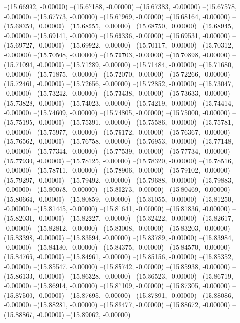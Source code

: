 --(15.66992, -0.00000)
--(15.67188, -0.00000)
--(15.67383, -0.00000)
--(15.67578, -0.00000)
--(15.67773, -0.00000)
--(15.67969, -0.00000)
--(15.68164, -0.00000)
--(15.68359, -0.00000)
--(15.68555, -0.00000)
--(15.68750, -0.00000)
--(15.68945, -0.00000)
--(15.69141, -0.00000)
--(15.69336, -0.00000)
--(15.69531, -0.00000)
--(15.69727, -0.00000)
--(15.69922, -0.00000)
--(15.70117, -0.00000)
--(15.70312, -0.00000)
--(15.70508, -0.00000)
--(15.70703, -0.00000)
--(15.70898, -0.00000)
--(15.71094, -0.00000)
--(15.71289, -0.00000)
--(15.71484, -0.00000)
--(15.71680, -0.00000)
--(15.71875, -0.00000)
--(15.72070, -0.00000)
--(15.72266, -0.00000)
--(15.72461, -0.00000)
--(15.72656, -0.00000)
--(15.72852, -0.00000)
--(15.73047, -0.00000)
--(15.73242, -0.00000)
--(15.73438, -0.00000)
--(15.73633, -0.00000)
--(15.73828, -0.00000)
--(15.74023, -0.00000)
--(15.74219, -0.00000)
--(15.74414, -0.00000)
--(15.74609, -0.00000)
--(15.74805, -0.00000)
--(15.75000, -0.00000)
--(15.75195, -0.00000)
--(15.75391, -0.00000)
--(15.75586, -0.00000)
--(15.75781, -0.00000)
--(15.75977, -0.00000)
--(15.76172, -0.00000)
--(15.76367, -0.00000)
--(15.76562, -0.00000)
--(15.76758, -0.00000)
--(15.76953, -0.00000)
--(15.77148, -0.00000)
--(15.77344, -0.00000)
--(15.77539, -0.00000)
--(15.77734, -0.00000)
--(15.77930, -0.00000)
--(15.78125, -0.00000)
--(15.78320, -0.00000)
--(15.78516, -0.00000)
--(15.78711, -0.00000)
--(15.78906, -0.00000)
--(15.79102, -0.00000)
--(15.79297, -0.00000)
--(15.79492, -0.00000)
--(15.79688, -0.00000)
--(15.79883, -0.00000)
--(15.80078, -0.00000)
--(15.80273, -0.00000)
--(15.80469, -0.00000)
--(15.80664, -0.00000)
--(15.80859, -0.00000)
--(15.81055, -0.00000)
--(15.81250, -0.00000)
--(15.81445, -0.00000)
--(15.81641, -0.00000)
--(15.81836, -0.00000)
--(15.82031, -0.00000)
--(15.82227, -0.00000)
--(15.82422, -0.00000)
--(15.82617, -0.00000)
--(15.82812, -0.00000)
--(15.83008, -0.00000)
--(15.83203, -0.00000)
--(15.83398, -0.00000)
--(15.83594, -0.00000)
--(15.83789, -0.00000)
--(15.83984, -0.00000)
--(15.84180, -0.00000)
--(15.84375, -0.00000)
--(15.84570, -0.00000)
--(15.84766, -0.00000)
--(15.84961, -0.00000)
--(15.85156, -0.00000)
--(15.85352, -0.00000)
--(15.85547, -0.00000)
--(15.85742, -0.00000)
--(15.85938, -0.00000)
--(15.86133, -0.00000)
--(15.86328, -0.00000)
--(15.86523, -0.00000)
--(15.86719, -0.00000)
--(15.86914, -0.00000)
--(15.87109, -0.00000)
--(15.87305, -0.00000)
--(15.87500, -0.00000)
--(15.87695, -0.00000)
--(15.87891, -0.00000)
--(15.88086, -0.00000)
--(15.88281, -0.00000)
--(15.88477, -0.00000)
--(15.88672, -0.00000)
--(15.88867, -0.00000)
--(15.89062, -0.00000)
